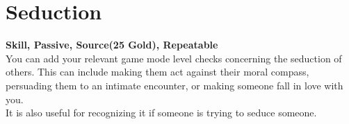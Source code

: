 \section{Seduction}\label{sec:seduction}
\textbf{Skill, Passive, Source(25 Gold), Repeatable}\\
You can add your relevant game mode level checks concerning the seduction of others.
This can include making them act against their moral compass, persuading them to an intimate encounter, or making someone fall in love with you.\\
It is also useful for recognizing it if someone is trying to seduce someone.